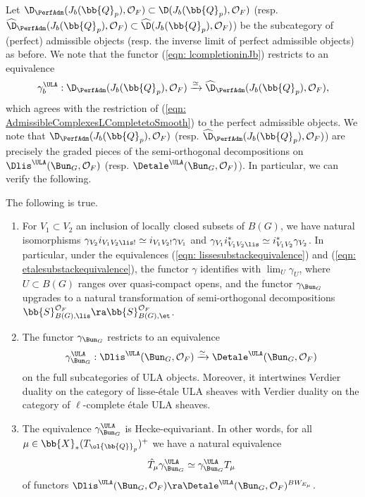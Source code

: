\documentclass[letterpaper,11pt]{amsart}
\begin{document}
Let $\D_{\PerfAdm}(J_{b}(\bb{Q}_{p}),\mathcal{O}_{F}) \subset \D(J_{b}(\bb{Q}_{p}),\mathcal{O}_{F})$  (resp. $\widehat{\D}_{\PerfAdm}(J_{b}(\bb{Q}_{p}),\mathcal{O}_{F}) \subset \widehat{\D}(J_{b}(\bb{Q}_{p}),\mathcal{O}_{F})$) be the subcategory of (perfect) admissible objects (resp. the inverse limit of perfect admissible objects) as before. We note that the functor (\ref{eqn: lcompletioninJb}) restricts to an equivalence
\begin{equation}{\label{eqn: lcompletioninJbperfadmissible}}
 \gamma_{b}^{\ULA}: \D_{\PerfAdm}(J_{b}(\bb{Q}_{p}),\mathcal{O}_{F}) \xrightarrow{\simeq} \widehat{\D}_{\PerfAdm}(J_{b}(\bb{Q}_{p}),\mathcal{O}_{F}),
\end{equation}
which agrees with the restriction of (\ref{eqn: AdmissibleComplexesLCompletetoSmooth}) to the perfect admissible objects. We note that $\D_{\PerfAdm}(J_{b}(\bb{Q}_{p}),\mathcal{O}_{F})$ (resp. $\widehat{\D}_{\PerfAdm}(J_{b}(\bb{Q}_{p}),\mathcal{O}_{F})$) are precisely the graded pieces of the semi-orthogonal decompositions on $\Dlis^{\ULA}(\Bun_{G},\mathcal{O}_{F})$ (resp. $\Detale^{\ULA}(\Bun_{G},\mathcal{O}_{F})$). In particular, we can verify the following.
\begin{lemma}{\label{lemma: FromLCompletetoSmooth}}
The following is true. 
\begin{enumerate}
\item For $V_{1} \subset V_{2}$ an inclusion of locally closed subsets of $B(G)$, we have natural isomorphisms $\gamma_{V_{2}} i_{V_{1}V_{2}\lis!} \simeq i_{V_{1}V_{2}!}\gamma_{V_{1}}$ and $\gamma_{V_{1}} i_{V_{1}V_{2}\lis}^{*} \simeq i_{V_{1}V_{2}}^{*}\gamma_{V_{2}}$. In particular, under the equivalences (\ref{eqn: lissesubstackequivalence}) and (\ref{eqn: etalesubstackequivalence}), the functor $\gamma$ identifies with $\lim_{U} \gamma_{U}$, where $U \subset B(G)$ ranges over quasi-compact opens, and the functor $\gamma_{\Bun_{G}}$ upgrades to a natural transformation of semi-orthogonal decompositions $\bb{S}_{B(G),\lis}^{\mathcal{O}_{F}} \ra \bb{S}_{B(G),\et}^{\mathcal{O}_{F}}$. 
\item  The functor $\gamma_{\Bun_{G}}$ restricts to an equivalence
\begin{equation}{\label{eqn: EquivalenceonULASheaves}} 
\gamma_{\Bun_{G}}^{\ULA}: \Dlis^{\ULA}(\Bun_{G},\mathcal{O}_{F}) \xrightarrow{\simeq} \Detale^{\ULA}(\Bun_{G},\mathcal{O}_{F})
\end{equation}
on the full subcategories of ULA objects. Moreover, it intertwines Verdier duality on the category of lisse-\'etale ULA sheaves with Verdier duality on the category of $\ell$-complete \'etale ULA sheaves.
\item The equivalence $\gamma^{\ULA}_{\Bun_{G}}$ is Hecke-equivariant. In other words, for all $\mu \in \bb{X}_{*}(T_{\ol{\bb{Q}}_{p}})^{+}$ we have a natural equivalence 
\[ \hat{T}_{\mu}\gamma^{\ULA}_{\Bun_{G}} \simeq \gamma^{\ULA}_{\Bun_{G}}T_{\mu} \]
of functors $\Dlis^{\ULA}(\Bun_{G},\mathcal{O}_{F}) \ra \Detale^{\ULA}(\Bun_{G},\mathcal{O}_{F})^{BW_{E_{\mu}}}$.
\end{enumerate}
\end{lemma}
\end{document}
